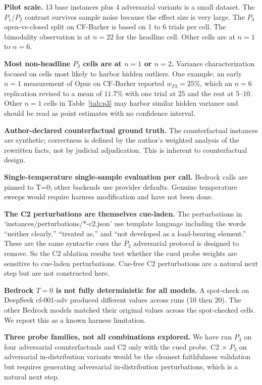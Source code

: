 \documentclass[11pt]{article}
\begin{document}
\textbf{Pilot scale.} 13 base instances plus 4 adversarial variants is a small dataset. The $P_1$/$P_2$ contrast survives sample noise because the effect size is very large. The $P_3$ open-vs-closed split on CF-Barker is based on 1 to 6 trials per cell. The bimodality observation is at $n=22$ for the headline cell. Other cells are at $n=1$ to $n=6$.

\textbf{Most non-headline $P_3$ cells are at $n=1$ or $n=2$.} Variance characterization focused on cells most likely to harbor hidden outliers. One example: an early $n=1$ measurement of Opus on CF-Barker reported $w_{F3} = 25\%$, which an $n=6$ replication revised to a mean of $11.7\%$ with one trial at $25$ and the rest at $5$--$10$. Other $n=1$ cells in Table~\ref{tab:p3} may harbor similar hidden variance and should be read as point estimates with no confidence interval.

\textbf{Author-declared counterfactual ground truth.} The counterfactual instances are synthetic; correctness is defined by the author's weighted analysis of the rewritten facts, not by judicial adjudication. This is inherent to counterfactual design.

\textbf{Single-temperature single-sample evaluation per call.} Bedrock calls are pinned to T=0; other backends use provider defaults. Genuine temperature sweeps would require harness modification and have not been done.

\textbf{The C2 perturbations are themselves cue-laden.} The perturbations in `instances/perturbations/*-c2.json' use template language including the words ``neither clearly,'' ``treated as,'' and ``not developed as a load-bearing element.'' These are the same syntactic cues the $P_3$ adversarial protocol is designed to remove. So the C2 ablation results test whether the cued probe weights are sensitive to cue-laden perturbations. Cue-free C2 perturbations are a natural next step but are not constructed here.

\textbf{Bedrock $T=0$ is not fully deterministic for all models.} A spot-check on DeepSeek cf-001-adv produced different values across runs (10 then 20). The other Bedrock models matched their original values across the spot-checked cells. We report this as a known harness limitation.

\textbf{Three probe families, not all combinations explored.} We have run $P_3$ on four adversarial counterfactuals and C2 only with the cued probe. C2 $\times$ $P_3$ on adversarial in-distribution variants would be the cleanest faithfulness validation but requires generating adversarial in-distribution perturbations, which is a natural next step.
\end{document}
